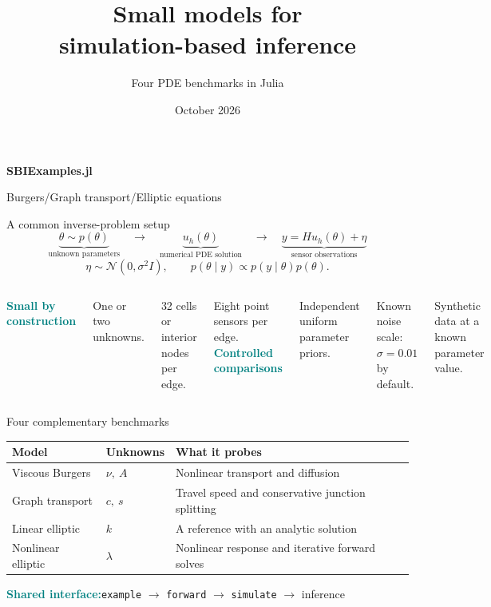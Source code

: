 \documentclass[aspectratio=169,11pt]{beamer}
\title{Small models for\\simulation-based inference}
\subtitle{Four PDE benchmarks in Julia}
\date{October 2026}
\newcommand{\sbiaccent}[1]{\textcolor{Teal}{\textbf{#1}}}
\begin{document}
\begin{frame}[plain]
\vspace{10mm}
{\small\color{Teal}\textbf{SBIExamples.jl}}\par\vspace{7mm}
{\inserttitle\par}
\vspace{5mm}
{\Large\color{Muted}\insertsubtitle\par}
\vfill
{\small Burgers\quad /\quad Graph transport\quad /\quad Elliptic equations}\par
\vspace{4mm}{\scriptsize\color{Muted}\insertdate}
\end{frame}

\begin{frame}{A common inverse-problem setup}
\[
\underbrace{\theta\sim p(\theta)}_{\text{unknown parameters}}
\quad\longrightarrow\quad
\underbrace{u_h(\theta)}_{\text{numerical PDE solution}}
\quad\longrightarrow\quad
\underbrace{y=H u_h(\theta)+\eta}_{\text{sensor observations}}
\]
\vspace{2mm}
\[\eta\sim\mathcal N(0,\sigma^2 I),\qquad p(\theta\mid y)\propto p(y\mid\theta)p(\theta).\]
\vspace{3mm}
\begin{columns}[T,onlytextwidth]
\sbiaccent{Small by construction}\par
One or two unknowns.\par
32 cells or interior nodes per edge.\par
Eight point sensors per edge.
\sbiaccent{Controlled comparisons}\par
Independent uniform parameter priors.\par
Known noise scale: $\sigma=0.01$ by default.\par
Synthetic data at a known parameter value.
\end{columns}
\end{frame}

\begin{frame}{Four complementary benchmarks}
\renewcommand{\arraystretch}{1.6}
\begin{tabular}{@{}p{3.2cm}p{3.1cm}p{6.0cm}@{}}
\toprule
\textbf{Model} & \textbf{Unknowns} & \textbf{What it probes}\\
\midrule
Viscous Burgers & $\nu,\ A$ & Nonlinear transport and diffusion\\
Graph transport & $c,\ s$ & Travel speed and conservative junction splitting\\
Linear elliptic & $k$ & A reference with an analytic solution\\
Nonlinear elliptic & $\lambda$ & Nonlinear response and iterative forward solves\\
\bottomrule
\end{tabular}
\vspace{5mm}
\sbiaccent{Shared interface:}\quad \texttt{example}\; $\rightarrow$\; \texttt{forward}\; $\rightarrow$\; \texttt{simulate}\; $\rightarrow$\; inference
\end{frame}
\end{document}
